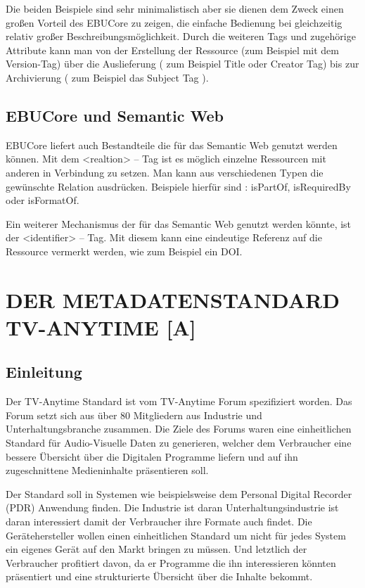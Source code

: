 Die beiden Beispiele sind sehr minimalistisch aber sie dienen dem Zweck einen großen Vorteil des EBUCore zu zeigen, die einfache Bedienung bei gleichzeitig relativ großer Beschreibungsmöglichkeit. Durch die weiteren Tags und zugehörige Attribute kann man von der Erstellung der Ressource (zum Beispiel mit dem Version-Tag) über die Auslieferung ( zum Beispiel Title oder Creator Tag)  bis zur Archivierung ( zum Beispiel das Subject Tag ).
\subsection{EBUCore und Semantic Web}

EBUCore liefert auch Bestandteile die für das Semantic Web genutzt werden können. Mit dem <realtion> -- Tag ist es möglich einzelne Ressourcen mit anderen in Verbindung zu setzen. Man kann aus verschiedenen Typen die gewünschte Relation ausdrücken. Beispiele hierfür sind : isPartOf, isRequiredBy oder isFormatOf.

	Ein weiterer Mechanismus der für das Semantic Web genutzt werden könnte, ist der <identifier> -- Tag. Mit diesem kann eine eindeutige Referenz auf die Ressource vermerkt werden, wie zum Beispiel ein DOI.
	\section{DER METADATENSTANDARD TV-ANYTIME [A]}
	\subsection{Einleitung}
	Der TV-Anytime Standard ist vom TV-Anytime Forum spezifiziert worden. Das Forum setzt sich aus über 80 Mitgliedern aus Industrie und Unterhaltungsbranche zusammen. Die Ziele des Forums waren eine einheitlichen Standard für Audio-Visuelle Daten zu generieren, welcher dem Verbraucher eine bessere Übersicht über die Digitalen Programme liefern und auf ihn zugeschnittene Medieninhalte präsentieren soll.
	
	Der Standard soll in Systemen wie beispielsweise dem Personal Digital Recorder (PDR) Anwendung finden. Die Industrie ist daran Unterhaltungsindustrie ist daran interessiert damit der Verbraucher ihre Formate auch findet. Die Gerätehersteller wollen einen einheitlichen Standard um nicht für jedes System ein eigenes Gerät auf den Markt bringen zu müssen. Und letztlich der Verbraucher profitiert davon, da er Programme die ihn interessieren könnten präsentiert und eine strukturierte Übersicht über die Inhalte bekommt.

